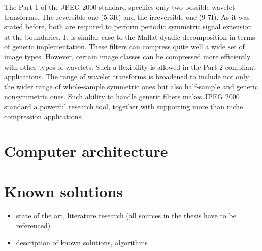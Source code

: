 The Part 1 of the JPEG 2000 standard specifies only two possible wavelet transforms.
The reversible one (5-3R) and the irreversible one (9-7I). As it was stated before, both
are required to perform periodic symmetric signal extension at the boundaries.
It is similar case to the Mallat dyadic decomposition in terms of generic implementation.
These filters can compress quite well a wide set of image types. However, certain image
classes can be compressed more efficiently with other types of wavelets. Such a flexibility
is allowed in the Part 2 compliant applications. The range of wavelet transforms is broadened
to include not only the wider range of whole-sample symmetric ones but also half-sample and
generic nonsymmetric ones. Such ability to handle generic filters makes JPEG 2000 standard
a powerful research tool, together with supporting more than niche compression applications.  \cite{jpeg_suite}

\section{Computer architecture}

    

\section{Known solutions}


\begin{itemize}
    \item state of the art, literature research (all sources in the thesis have to be referenced)
    \item description of known solutions, algorithms
\end{itemize}
